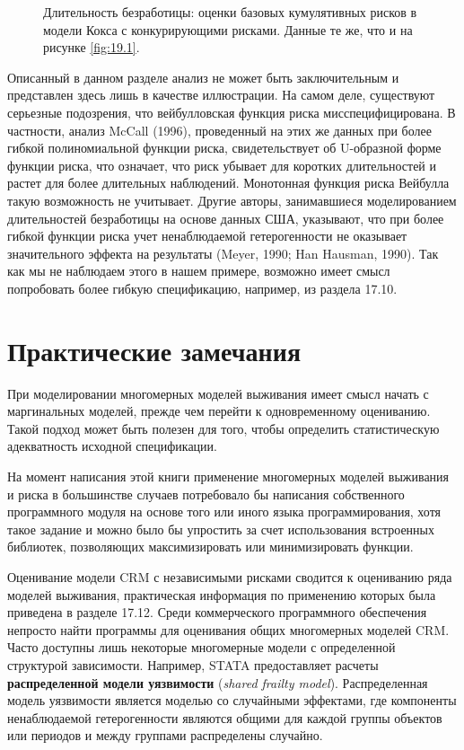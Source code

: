 \begin{figure}[ht!]\caption{Длительность безработицы: оценки базовых кумулятивных рисков в модели Кокса с конкурирующими рисками. Данные те же, что и на рисунке \ref{fig:19.1}.}\label{fig:19.2}
\centering
\end{figure}

Описанный в данном разделе анализ не может быть заключительным и представлен здесь лишь в качестве иллюстрации. На самом деле, существуют серьезные подозрения, что вейбулловская функция риска мисспецифицирована. В частности, анализ McCall (1996), проведенный на этих же данных при более гибкой полиномиальной функции риска, свидетельствует об U-образной форме функции риска, что означает, что риск убывает для коротких длительностей и растет для более длительных наблюдений. Монотонная функция риска Вейбулла такую возможность не учитывает. Другие авторы, занимавшиеся моделированием длительностей безработицы на основе данных США, указывают, что при более гибкой функции риска учет ненаблюдаемой гетерогенности не оказывает значительного эффекта на результаты (Meyer, 1990; Han Hausman, 1990). Так как мы не наблюдаем этого в нашем примере, возможно имеет смысл попробовать более гибкую спецификацию, например, из раздела 17.10. %



\section{Практические замечания}\label{sec:19.6}

\noindent
При моделировании многомерных моделей выживания имеет смысл начать с маргинальных моделей, прежде чем перейти к одновременному оцениванию. Такой подход может быть полезен для того, чтобы определить статистическую адекватность исходной спецификации.

На момент написания этой книги применение многомерных моделей выживания и риска в большинстве случаев потребовало бы написания собственного программного модуля на основе того или иного языка программирования, хотя такое задание и можно было бы упростить за счет использования встроенных библиотек, позволяющих максимизировать или минимизировать функции.

Оценивание модели CRM с независимыми рисками сводится к оцениванию ряда моделей выживания, практическая информация по применению которых была приведена в разделе 17.12. %
Среди коммерческого программного обеспечения непросто найти программы для оценивания общих многомерных моделей CRM. Часто доступны лишь некоторые многомерные модели с определенной структурой зависимости. Например, STATA предоставляет расчеты \textbf{распределенной модели уязвимости} (\textit{shared frailty model}). Распределенная модель уязвимости является моделью со случайными эффектами, где компоненты ненаблюдаемой гетерогенности являются общими для каждой группы объектов или периодов и между группами распределены случайно.

